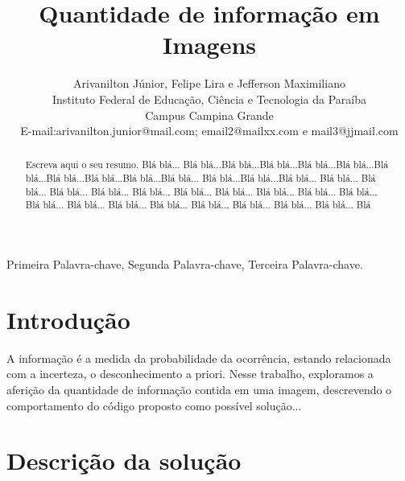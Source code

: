 \documentclass[journal]{IEEEtran}
\begin{document}
\title{Quantidade de informação em Imagens}


\author{Arivanilton Júnior, Felipe Lira e Jefferson Maximiliano\\

Instituto Federal de Educação, Ciência e Tecnologia da Paraíba\\Campus Campina Grande\\
E-mail:arivanilton.junior@mail.com; email2@mailxx.com e mail3@jjmail.com\\
}



\maketitle


\begin{abstract}
Escreva aqui o seu resumo. Blá blá... 
Blá blá...Blá blá...Blá blá...Blá blá...Blá blá...Blá blá...Blá blá...Blá blá...Blá blá...Blá blá...
Blá blá...Blá blá...Blá blá... Blá blá... Blá blá... Blá blá... Blá blá... Blá blá... Blá blá... Blá blá... Blá blá... 
Blá blá... Blá blá... Blá blá... Blá blá... Blá blá... Blá blá... Blá blá... Blá blá... Blá blá... Blá blá... Blá 
\end{abstract}



\begin{IEEEkeywords}
Primeira Palavra-chave, Segunda Palavra-chave, Terceira Palavra-chave.
\end{IEEEkeywords}







\section{Introdução}

 A informação é a medida da probabilidade da ocorrência, estando relacionada com a incerteza, o desconhecimento a priori. Nesse trabalho, exploramos a aferição da quantidade de informação contida em uma imagem, descrevendo o comportamento do código proposto como possível solução...



\section{Descrição da solução}
\end{document}
